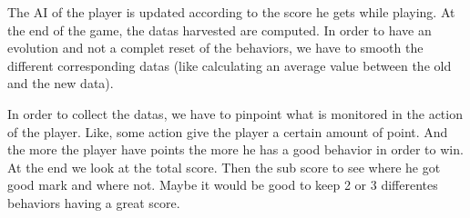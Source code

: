\documentclass[conference]{acmsiggraph}
\begin{document}
The AI of the player is updated according to the score he gets while playing. At the end of the game, the datas harvested are computed.
In order to have an evolution and not a complet reset of the behaviors, we have to smooth the different corresponding datas (like calculating an average value between the old and the new data).

In order to collect the datas, we have to pinpoint what is monitored in the action of the player.
Like, some action give the player a certain amount of point. And the more the player have points the more he has a good behavior in order to win.
At the end we look at the total score. Then the sub score to see where he got good mark and where not.
Maybe it would be good to keep 2 or 3 differentes behaviors having a great score.


\end{document}
